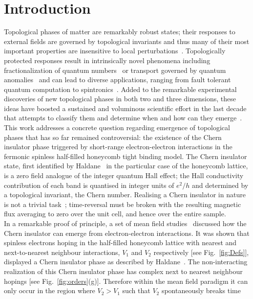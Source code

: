 \documentclass[aps,prx,10pt,twocolumn,floatfix,superscriptaddress,showpacs,numerical,footinbib]{revtex4-1}
\begin{document}
\section{Introduction}
%
Topological phases of matter are remarkably robust states; their responses to external fields are
governed by topological invariants and thus many of their most important properties are insensitive to local perturbations~\cite{HK10,QZ11}.
%
Topologically protected responses result in intrinsically novel phenomena
including fractionalization of quantum numbers~\cite{Nayak2008} or transport governed by quantum anomalies~\cite{V03}
and can lead to diverse applications, ranging from fault tolerant quantum computation to spintronics~\cite{HK10,QZ11,Nayak2008}.
%
Added to the remarkable experimental discoveries of new topological phases in both two and three dimensions,
these ideas have boosted a sustained and voluminous scientific effort in the last decade that attempts to classify them 
and determine when and how can they emerge~\cite{S14}.\\
%
This work addresses a concrete question regarding emergence of topological phases that has so far remained controversial: 
the existence of the Chern insulator phase triggered by short-range electron-electron interactions in the
fermonic spinless half-filled honeycomb tight binding model.
%
The Chern insulator state, first identified by Haldane~\cite{H88} in the particular case of the honeycomb lattice, is a zero field analogue of the
integer quantum Hall effect; the Hall conductivity contribution of each band is quantised in integer units of $e^2/h$ and determined by a topological invariant, the Chern number.
%
Realising a Chern insulator in nature is not a trivial task~\cite{CZF13}; time-reversal must be broken with
the resulting magnetic flux averaging to zero over the unit cell, and hence over the entire sample.\\
%
In a remarkable proof of principle, a set of mean field studies~\cite{RQHZ08,WF10,GCC13} 
discussed how the Chern insulator can emerge from electron-electron interactions. 
%
It was shown that spinless electrons hoping in the half-filled honeycomb lattice with nearest and next-to-nearest neighbour interactions, $V_{1}$ and $V_{2}$ respectively 
[see Fig.~\ref{fig:Defs}], displayed a Chern insulator phase as described by Haldane~\cite{H88}.
%
The non-interacting realization of this Chern insulator phase has complex next to nearest neighbour hopings [see Fig.~\ref{fig:orders}(g)].
%
Therefore within the mean field paradigm it can only occur in the region where $V_{2}>V_{1}$ such that $V_{2}$ spontaneously breaks time
\end{document}
